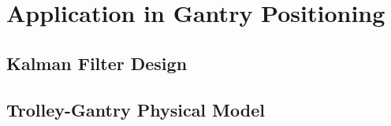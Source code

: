 %		

\section{Application in Gantry Positioning}
	
	\subsection{Kalman Filter Design}
	
	
	\subsection{Trolley-Gantry Physical Model}
	
	



\clearpage

%

\clearpage




